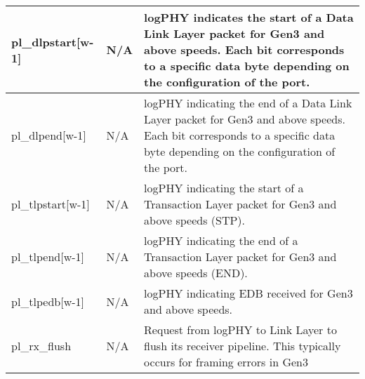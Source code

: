 \begin{table}[H]

    \centering
  \begin{tabular}{ |m{26mm}|P{18mm}|m{60mm}|  }
  \hline

pl\_dlpstart[w-1] &N/A & logPHY indicates the start of a Data Link Layer packet for Gen3 and above speeds. Each
bit corresponds to a specific data byte depending on the configuration of the port.\\ \hline 
pl\_dlpend[w-1] &N/A & logPHY indicating the end of a Data Link Layer packet for Gen3 and above speeds. Each
bit corresponds to a specific data byte depending on the configuration of the port.\\ \hline
pl\_tlpstart[w-1] &N/A &logPHY indicating the start of a Transaction Layer packet for Gen3 and above speeds
(STP). \\ \hline
pl\_tlpend[w-1] &N/A & logPHY indicating the end of a Transaction Layer packet for Gen3 and above speeds
(END).\\ \hline
pl\_tlpedb[w-1] &N/A & logPHY indicating EDB received for Gen3 and above speeds. \\ \hline
pl\_rx\_flush &N/A & Request from logPHY to Link Layer to flush its receiver pipeline. This typically occurs for
framing errors in Gen3\\ \hline

\end{tabular}
\end{table}




